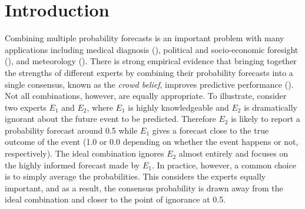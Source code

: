 \documentclass[11pt]{article}
\theoremstyle{definition}
\theoremstyle{definition}
\begin{document}
\section{Introduction}
Combining multiple probability forecasts is an important problem with many applications including medical diagnosis (\cite{wilson1998prediction, pepe2003statistical}), political and socio-economic foresight (\cite{tetlock2005expert}), and meteorology (\cite{sanders1963subjective, vislocky1995improved, baars2005performance}). There is strong empirical evidence that bringing together the strengths of different experts by combining their probability forecasts into a single consensus, known as the \textit{crowd belief},  improves predictive performance (\cite{clemen1989combining, armstrong2001combining}). Not all combinations, however, are equally appropriate. To illustrate, consider two experts $E_1$ and $E_2$, where $E_1$ is highly knowledgeable and $E_2$ is dramatically  ignorant about the future event to be predicted. Therefore $E_2$ is likely to report a probability forecast around 0.5 while $E_1$ gives a forecast close to the true outcome of the event (1.0 or 0.0 depending on whether the event happens or not, respectively). The ideal combination ignores $E_2$ almost entirely and focuses on the highly informed forecast made by $E_1$. In practice, however, a common choice is to simply average the probabilities. This considers the experts equally important, and as a result, the consensus probability is drawn away from the ideal combination and closer to the point of ignorance at 0.5. 







% 
\end{document}
